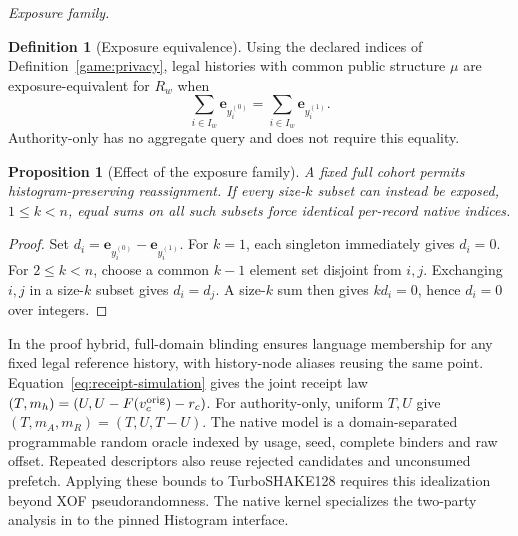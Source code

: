 \documentclass[conference,compsoc]{IEEEtran}
\theoremstyle{definition}
\newtheorem{definition}{Definition}[section]
\newtheorem{definition}{Definition}
\numberwithin{equation}{section}
\numberwithin{table}{section}
\numberwithin{figure}{section}
\theoremstyle{plain}
\newtheorem{proposition}{Proposition}[section]
\newtheorem{proposition}{Proposition}
\begin{document}
\par\noindent\emph{Exposure family.}
\begin{definition}[Exposure equivalence]
\label{def:exposure-equivalence}
Using the declared indices of Definition~\ref{game:privacy}, legal histories
with common public structure \(\mu\) are exposure-equivalent for \(R_w\) when
\begin{equation}
 \sum_{i\in I_w}\mathbf e_{y_i^{(0)}}=
 \sum_{i\in I_w}\mathbf e_{y_i^{(1)}}.
 \label{eq:exposure-equivalence}
\end{equation}
Authority-only has no aggregate query and does not require this equality.
\end{definition}

\begin{proposition}[Effect of the exposure family]
\label{prop:exposure-family}
A fixed full cohort permits histogram-preserving reassignment. If every
size-\(k\) subset can instead be exposed, \(1\le k<n\), equal sums on
all such subsets force identical per-record native indices.
\end{proposition}
\begin{proof}
Set \(d_i=\mathbf e_{y_i^{(0)}}-\mathbf e_{y_i^{(1)}}\).
For \(k=1\), each singleton immediately gives \(d_i=0\). For \(2\le k<n\),
choose a common \(k-1\) element set disjoint from \(i,j\). Exchanging \(i,j\) in a size-\(k\) subset gives \(d_i=d_j\).
A size-\(k\) sum then gives \(kd_i=0\), hence \(d_i=0\) over integers.
\end{proof}

\label{lem:pedersen-language-lifting}
In the proof hybrid, full-domain blinding ensures language membership for any fixed legal reference history, with history-node aliases reusing the same point.
\label{lem:receipt-coupling}
Equation~\eqref{eq:receipt-simulation} gives the joint receipt law \((T,m_h)=(U,U-F(v_c^{\rm orig})-r_c)\). For authority-only, uniform \(T,U\) give \((T,m_A,m_R)=(T,U,T-U)\). The native model is a domain-separated programmable random oracle indexed by usage, seed, complete binders and raw offset. Repeated descriptors also reuse rejected candidates and unconsumed prefetch. Applying these bounds to TurboSHAKE128 requires this idealization beyond XOF pseudorandomness. The native kernel specializes the two-party analysis in \cite{Davis2023VDAFPrivacy} to the pinned Histogram interface.
\end{document}
